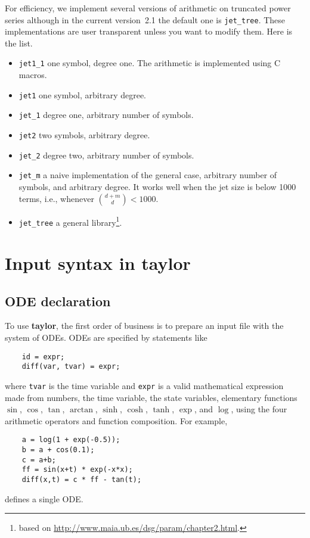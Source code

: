 \documentclass[10pt]{article}
\theoremstyle{remark}
\newcommand{\taylorname}{{\bf taylor}}
\newcommand{\version}{2.1}
\begin{document}
For efficiency, we implement several versions of arithmetic on
truncated power series although in the current version~\version{} the
default one is \verb+jet_tree+. These implementations are user
transparent unless you want to modify them. Here is the list.
\begin{itemize}
    \item \verb+jet1_1+ one symbol, degree one. The arithmetic is
      implemented using C macros.
    \item \verb+jet1+ one symbol, arbitrary degree. 
    \item \verb+jet_1+ degree one, arbitrary number of symbols.
    \item \verb+jet2+ two symbols, arbitrary degree.
    \item \verb+jet_2+ degree two, arbitrary number of symbols.
    \item \verb+jet_m+ a naive implementation of the general case,
      arbitrary number of symbols, and arbitrary degree. It works well
      when the jet size is below 1000 terms, i.e., whenever ${{d+m}
        \choose {d}} < 1000$.
    \item \verb+jet_tree+ a general library\footnote{based on
    \url{http://www.maia.ub.es/dsg/param/chapter2.html}.}.
\end{itemize}


\section{Input syntax in \taylorname{}} \label{sec:syntax}

\subsection*{ODE declaration}
To use \taylorname{}, the first order of business is to prepare an
input file with the system of ODEs.  ODEs are specified by statements
like
\begin{verbatim}
    id = expr;
    diff(var, tvar) = expr;
\end{verbatim}
where {\tt tvar} is the time variable and {\tt expr} is a valid
mathematical expression made from numbers, the time variable, the
state variables, elementary functions $\sin$, $\cos$, $\tan$,
$\arctan$, $\sinh$, $\cosh$, $\tanh$, $\exp$, and $\log$, using the
four arithmetic operators and function composition. For example,
\begin{verbatim}
    a = log(1 + exp(-0.5));
    b = a + cos(0.1);
    c = a+b;
    ff = sin(x+t) * exp(-x*x);
    diff(x,t) = c * ff - tan(t);
\end{verbatim}
defines a single ODE.
\end{document}
